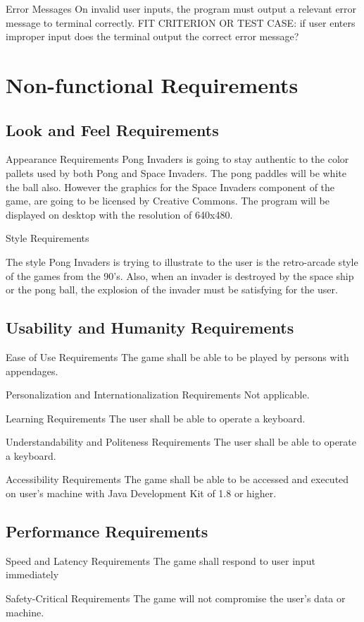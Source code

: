 \documentclass[12pt, titlepage]{article}
\begin{document}
Error Messages
On invalid user inputs, the program must output a relevant error message to terminal correctly.
FIT CRITERION OR TEST CASE: if user enters improper input does the terminal output the correct error message?
\section{Non-functional Requirements}
\subsection{Look and Feel Requirements}
Appearance Requirements
Pong Invaders is going to stay authentic to the color pallets used by both Pong and Space Invaders. The pong paddles will be white the ball also. However the graphics for the Space Invaders component of the game, are going to be licensed by Creative Commons. The program will be displayed on desktop with the resolution of 640x480.


Style Requirements

The style Pong Invaders is trying to illustrate to the user is the retro-arcade style of the games from the 90’s. Also, when an invader is destroyed by the space ship or the pong ball, the explosion of the invader must be satisfying for the user. 


\subsection{Usability and Humanity Requirements}
Ease of Use Requirements 
The game shall be able to be played by persons with appendages. 

Personalization and Internationalization Requirements
Not applicable. 

Learning Requirements 
The user shall be able to operate a keyboard.

Understandability and Politeness Requirements
The user shall be able to operate a keyboard.

Accessibility Requirements 
The game shall be able to be accessed and executed on user’s machine with Java Development Kit of 1.8 or higher. 

\subsection{Performance Requirements}
Speed and Latency Requirements 
The game shall respond to user input immediately

Safety-Critical Requirements 
The game will not compromise the user’s data or machine. 
\end{document}
